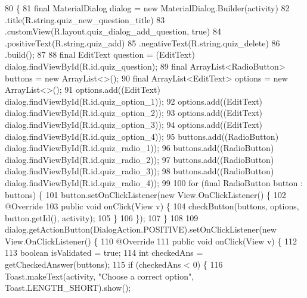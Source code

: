 \begin{DoxyCode}
80                                                  \{
81         \textcolor{keyword}{final} MaterialDialog dialog = \textcolor{keyword}{new} MaterialDialog.Builder(activity)
82                 .title(R.string.quiz\_new\_question\_title)
83                 .customView(R.layout.quiz\_dialog\_add\_question, \textcolor{keyword}{true})
84                 .positiveText(R.string.quiz\_add)
85                 .negativeText(R.string.quiz\_delete)
86                 .build();
87 
88         \textcolor{keyword}{final} EditText question = (EditText) dialog.findViewById(R.id.quiz\_question);
89         \textcolor{keyword}{final} ArrayList<RadioButton> buttons = \textcolor{keyword}{new} ArrayList<>();
90         \textcolor{keyword}{final} ArrayList<EditText> options = \textcolor{keyword}{new} ArrayList<>();
91         options.add((EditText) dialog.findViewById(R.id.quiz\_option\_1));
92         options.add((EditText) dialog.findViewById(R.id.quiz\_option\_2));
93         options.add((EditText) dialog.findViewById(R.id.quiz\_option\_3));
94         options.add((EditText) dialog.findViewById(R.id.quiz\_option\_4));
95         buttons.add((RadioButton) dialog.findViewById(R.id.quiz\_radio\_1));
96         buttons.add((RadioButton) dialog.findViewById(R.id.quiz\_radio\_2));
97         buttons.add((RadioButton) dialog.findViewById(R.id.quiz\_radio\_3));
98         buttons.add((RadioButton) dialog.findViewById(R.id.quiz\_radio\_4));
99 
100         \textcolor{keywordflow}{for} (\textcolor{keyword}{final} RadioButton button : buttons) \{
101             button.setOnClickListener(\textcolor{keyword}{new} View.OnClickListener() \{
102                 @Override
103                 \textcolor{keyword}{public} \textcolor{keywordtype}{void} onClick(View v) \{
104                     checkButton(buttons, options, button.getId(), activity);
105                 \}
106             \});
107         \}
108 
109         dialog.getActionButton(DialogAction.POSITIVE).setOnClickListener(\textcolor{keyword}{new} View.OnClickListener() \{
110             @Override
111             \textcolor{keyword}{public} \textcolor{keywordtype}{void} onClick(View v) \{
112 
113                 \textcolor{keywordtype}{boolean} isValidated = \textcolor{keyword}{true};
114                 \textcolor{keywordtype}{int} checkedAns = getCheckedAnswer(buttons);
115                 \textcolor{keywordflow}{if} (checkedAns < 0) \{
116                     Toast.makeText(activity, \textcolor{stringliteral}{"Choose a correct option"}, Toast.LENGTH\_SHORT).show();

\end{DoxyCode}
